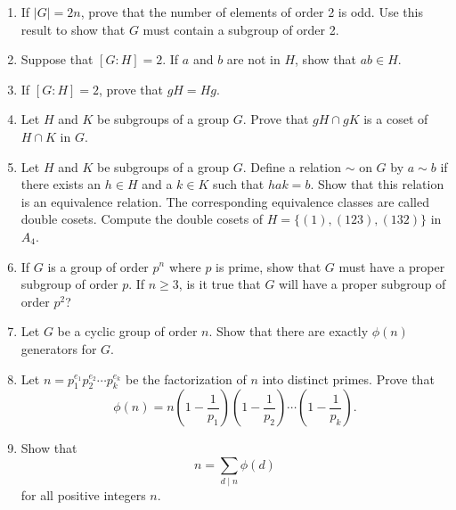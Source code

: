 {\begin{enumerate}
\item
If $|G| = 2n$, prove that the number of elements of order 2 is odd.  Use this result to show that $G$ must contain a subgroup of order 2.

\item
Suppose that $[G : H] = 2$. If $a$ and $b$ are not in $H$, show that $ab \in H$.

\item
If $[G : H] = 2$, prove that $gH = Hg$.

\item
Let $H$ and $K$ be subgroups of a group $G$.  Prove that $gH \cap gK$ is a coset of $H \cap K$ in $G$.  
 
\item
Let $H$ and $K$ be subgroups of a group $G$.  Define a relation $\sim$ on $G$ by $a \sim b$ if there exists an $h \in H$ and a $k \in K$ such that $hak = b$.  Show that this relation is an equivalence relation.  The corresponding equivalence classes are called {\bfi double cosets}.  Compute the double cosets of $H = \{ (1),(123), (132) \}$ in~$A_4$. 
 
\item
If $G$ is a group of order $p^n$ where $p$ is prime, show that $G$ must have a proper subgroup of order $p$.  If $n \geq 3$, is it true that $G$ will have a proper subgroup of order $p^2$?
 
\item
Let $G$ be a cyclic group of order $n$.  Show that there are exactly $\phi(n)$ generators for $G$.

\item
Let $n = p_1^{e_1} p_2^{e_2} \cdots p_k^{e_k}$ be the factorization of $n$ into distinct primes.  Prove that
\[
\phi(n) =  n 
\left( 1- \frac{1}{p_1} \right)
\left( 1- \frac{1}{p_2} \right)	\cdots
\left( 1- \frac{1}{p_k} \right).
\]

\item
Show that 
\[
n = \sum_{d \mid n} \phi(d)
\]
for all positive integers $n$.

\end{enumerate}
}



